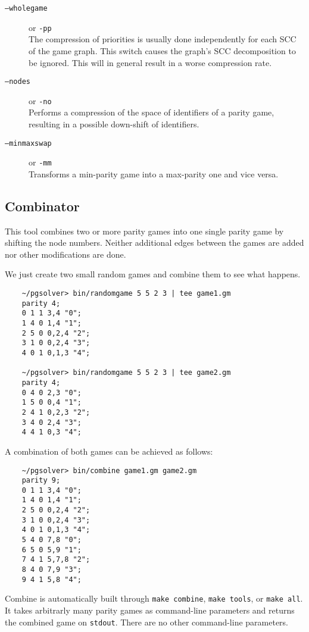 \begin{description}
\item[{\tt --wholegame}] \enspace or {\tt -pp} \\
    The compression of priorities is usually done independently for each SCC of the game graph.
    This switch causes the graph's SCC decomposition to be ignored. This will in general result
    in a worse compression rate.

\item[{\tt --nodes}] \enspace or {\tt -no} \\
    Performs a compression of the space of identifiers of a parity game, resulting in a possible
    down-shift of identifiers.

\item[{\tt --minmaxswap}] \enspace or {\tt -mm} \\
    Transforms a min-parity game into a max-parity one and vice versa.
\end{description}


\subsection{Combinator}

This tool combines two or more parity games into one single parity game by shifting the node numbers.
Neither additional edges between the games are added nor other modifications are done.

\begin{example}
We just create two small random games and combine them to see what happens.
\begin{verbatim}
    ~/pgsolver> bin/randomgame 5 5 2 3 | tee game1.gm
    parity 4;
    0 1 1 3,4 "0";
    1 4 0 1,4 "1";
    2 5 0 0,2,4 "2";
    3 1 0 0,2,4 "3";
    4 0 1 0,1,3 "4";

    ~/pgsolver> bin/randomgame 5 5 2 3 | tee game2.gm
    parity 4;
    0 4 0 2,3 "0";
    1 5 0 0,4 "1";
    2 4 1 0,2,3 "2";
    3 4 0 2,4 "3";
    4 4 1 0,3 "4";
\end{verbatim}
A combination of both games can be achieved as follows:
\begin{verbatim}
    ~/pgsolver> bin/combine game1.gm game2.gm
    parity 9;
    0 1 1 3,4 "0";
    1 4 0 1,4 "1";
    2 5 0 0,2,4 "2";
    3 1 0 0,2,4 "3";
    4 0 1 0,1,3 "4";
    5 4 0 7,8 "0";
    6 5 0 5,9 "1";
    7 4 1 5,7,8 "2";
    8 4 0 7,9 "3";
    9 4 1 5,8 "4";
\end{verbatim}
\end{example}

Combine is automatically built through \verb#make combine#,
\verb#make tools#, or \verb#make all#.
It takes arbitrarly many parity games as command-line parameters and returns the
combined game on \texttt{stdout}. There are no other command-line parameters.


